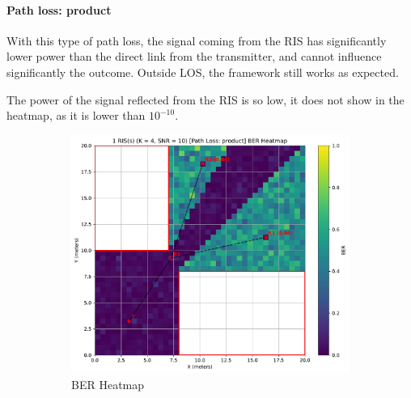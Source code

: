 \paragraph*{Path loss: product}

With this type of path loss, the signal coming from the RIS has significantly lower power than the direct link from the transmitter, and cannot influence significantly the outcome. Outside LOS, the framework still works as expected.

The power of the signal reflected from the RIS is so low, it does not show in the heatmap, as it is lower than $10^{-10}$.

\begin{figure}[H]
  \centering
  \begin{subfigure}[b]{0.48\textwidth}
    \centering
    \includegraphics[width=\textwidth]{imgs/heatmap-simulations/1 RIS(s) (K = 4, SNR = 10) [Path Loss: product] BER Heatmap.pdf}
    \caption{BER Heatmap}
  \end{subfigure}
  \hfill
  \begin{subfigure}[b]{0.48\textwidth}
    \centering

\end{subfigure}
\end{figure}
